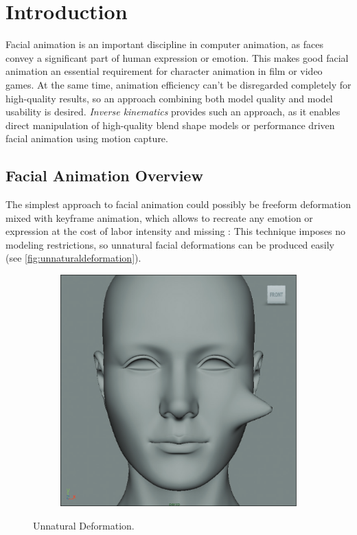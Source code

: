 \chapter{Introduction}
\label{chap:introduction}

Facial animation is an important discipline in computer animation,
as faces convey a significant part of human expression or emotion.
This makes good facial animation an essential requirement for character animation in film or video games.
At the same time, animation efficiency can't be disregarded completely for high-quality results,
so an approach combining both model quality and model usability is desired.
\textit{Inverse kinematics} provides such an approach,
as it enables direct manipulation of high-quality blend shape models or performance driven facial animation using motion capture.

\section{Facial Animation Overview}
\label{sec:facialanimationmethods}

The simplest approach to facial animation could possibly be freeform deformation mixed with keyframe animation,
which allows to recreate any emotion or expression at the cost of labor intensity and missing :
This technique imposes no modeling restrictions, so unnatural facial deformations can be produced easily (see \autoref{fig:unnaturaldeformation}).

\begin{figure}[h]
  \centering
  \begin{subfigure}[b]{0.3\textwidth}
	\includegraphics[scale=0.3]{img/unnatural_deformation.png}
  \end{subfigure}
  \caption{Unnatural Deformation.~\autocite{directmanipulationblendshapes}}
  \label{fig:unnaturaldeformation}
\end{figure}

